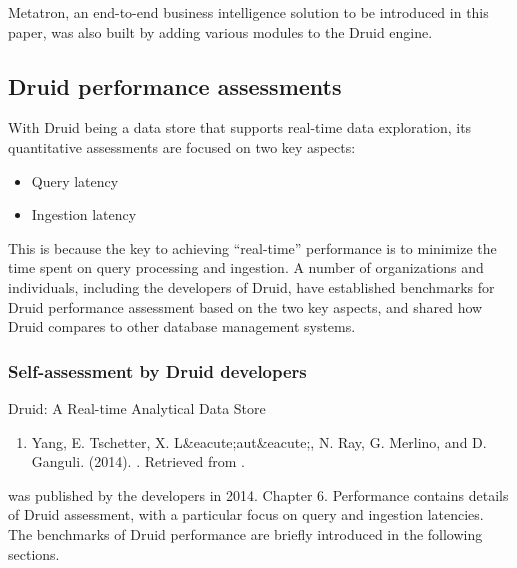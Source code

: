 \documentclass[letterpaper,10pt,english]{sphinxmanual}
\begin{document}
Metatron, an end-to-end business intelligence solution to be introduced in this paper, was also built by adding various modules to the Druid engine.


\subsection{Druid performance assessments}
\label{\detokenize{discovery/part01/druid_tests:druid}}\label{\detokenize{discovery/part01/druid_tests::doc}}
With Druid being a data store that supports real-time data exploration, its quantitative assessments are focused on two key aspects:
\begin{itemize}
\item {} 
Query latency

\item {} 
Ingestion latency

\end{itemize}

This is because the key to achieving “real-time” performance is to minimize the time spent on query processing and ingestion. A number of organizations and individuals, including the developers of Druid, have established benchmarks for Druid performance assessment based on the two key aspects, and shared how Druid compares to other database management systems.


\subsubsection{Self-assessment by Druid developers}
\label{\detokenize{discovery/part01/druid_tests:id1}}
Druid: A Real-time Analytical Data Store%
\begin{footnote}[1]\sphinxAtStartFootnote
\begin{enumerate}
\def\theenumi{\Alph{enumi}}
\def\labelenumi{\theenumi .}
\makeatletter\def\p@enumii{\p@enumi \theenumi .}\makeatother
\setcounter{enumi}{5}
\item {} 
Yang, E. Tschetter, X. L\&eacute;aut\&eacute;, N. Ray, G. Merlino, and D. Ganguli. (2014). . Retrieved from .

\end{enumerate}
%
\end{footnote} was published by the developers in 2014. Chapter 6. Performance contains details of Druid assessment, with a particular focus on query and ingestion latencies. The benchmarks of Druid performance are briefly introduced in the following sections.
\end{document}
